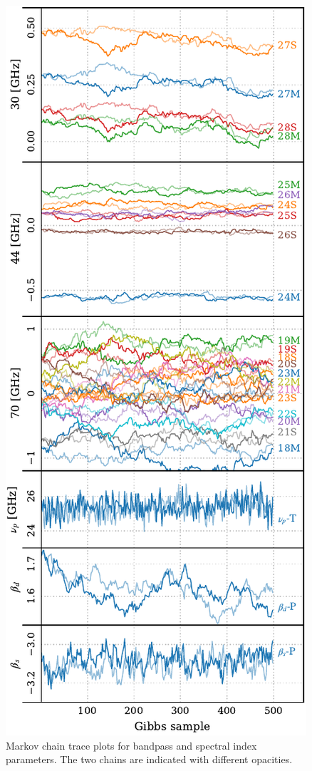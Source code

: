 \documentclass[twocolumn]{aa}
\newcommand{\?}[1]{\textcolor{red}{{\bf [#1]}}}
\begin{document}
  \begin{figure}[t] %
    \center
    \includegraphics[width=0.95\linewidth]{figs/traceplot_BP101.pdf}
    \caption{Markov chain trace plots for bandpass and spectral index parameters. The two chains are indicated with different opacities.}
    \label{fig:traceplot}
  \end{figure}
  
\end{document}
